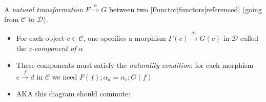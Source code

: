 
A \emph{natural transformation} $F \overset{a}\Rightarrow G$ between two \ref{Functor|functors|referenced} (going from $\mathcal{C}$ to $\mathcal{D}$).

\begin{itemize}
    \item For each object $c \in \mathcal{C}$, one specifies a morphism $F(c)\xrightarrow{\alpha_c}G(c)$ in $\mathcal{D}$ called the \emph{c-component of} $\alpha$
    \item These components must satisfy the \emph{naturality condition}: for each morphism $c \xrightarrow{f} d$ in $\mathcal{C}$ we need $F(f);\alpha_d=\alpha_c;G(f)$
    \item AKA this diagram should commute: 
  \end{itemize}
